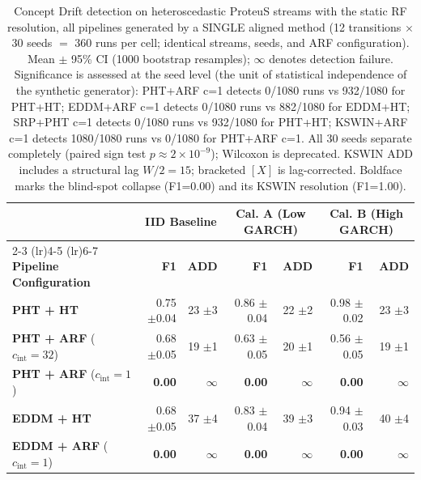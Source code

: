 \begin{table}[t]
  \centering
  \caption{Concept Drift detection on heteroscedastic ProteuS streams with the static RF resolution, all pipelines generated by a SINGLE aligned method (12 transitions $\times$ 30 seeds $=$ 360 runs per cell; identical streams, seeds, and ARF configuration). Mean $\pm$ 95\% CI (1000 bootstrap resamples); $\infty$ denotes detection failure. Significance is assessed at the seed level (the unit of statistical independence of the synthetic generator): PHT+ARF c=1 detects 0/1080 runs vs 932/1080 for PHT+HT; EDDM+ARF c=1 detects 0/1080 runs vs 882/1080 for EDDM+HT; SRP+PHT c=1 detects 0/1080 runs vs 932/1080 for PHT+HT; KSWIN+ARF c=1 detects 1080/1080 runs vs 0/1080 for PHT+ARF c=1. All 30 seeds separate completely (paired sign test $p \approx 2\times10^{-9}$); Wilcoxon is deprecated. KSWIN ADD includes a structural lag $W/2 = 15$; bracketed $[X]$ is lag-corrected. Boldface marks the blind-spot collapse (F1=0.00) and its KSWIN resolution (F1=1.00).}
  \label{tab:results_concept}
  \begin{tabular}{@{}lrrrrrr@{}}
    \toprule
                                                   & \multicolumn{2}{c}{\textbf{IID Baseline}} & \multicolumn{2}{c}{\textbf{Cal. A (Low GARCH)}} & \multicolumn{2}{c}{\textbf{Cal. B (High GARCH)}} \\
    \cmidrule(lr){2-3} \cmidrule(lr){4-5} \cmidrule(lr){6-7}
    \textbf{Pipeline Configuration}                & \textbf{F1} & \textbf{ADD} & \textbf{F1} & \textbf{ADD} & \textbf{F1} & \textbf{ADD} \\
    \midrule
    \textbf{PHT + HT}                              & 0.75 {\small $\pm$0.04} & 23 {\small $\pm$3} & 0.86 {\small $\pm$0.04} & 22 {\small $\pm$2} & 0.98 {\small $\pm$0.02} & 23 {\small $\pm$3} \\
    \textbf{PHT + ARF} ($c_{\mathrm{int}} = 32$)   & 0.68 {\small $\pm$0.05} & 19 {\small $\pm$1} & 0.63 {\small $\pm$0.05} & 20 {\small $\pm$1} & 0.56 {\small $\pm$0.05} & 19 {\small $\pm$1} \\
    \textbf{PHT + ARF} ($c_{\mathrm{int}} = 1$)    & \textbf{0.00} & $\infty$ & \textbf{0.00} & $\infty$ & \textbf{0.00} & $\infty$ \\
    \midrule
    \textbf{EDDM + HT}                             & 0.68 {\small $\pm$0.05} & 37 {\small $\pm$4} & 0.83 {\small $\pm$0.04} & 39 {\small $\pm$3} & 0.94 {\small $\pm$0.03} & 40 {\small $\pm$4} \\
    \textbf{EDDM + ARF} ($c_{\mathrm{int}} = 1$)   & \textbf{0.00} & $\infty$ & \textbf{0.00} & $\infty$ & \textbf{0.00} & $\infty$ \\

\end{tabular}
\end{table}
